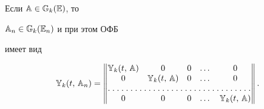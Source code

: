 \begin{lemnonum} 


Если $\Bbb A\in\Bbb G_k(\Bbb E)$, то 


$\Bbb A_n\in\Bbb G_k(\Bbb E_n)$ и при этом ОФБ 


имеет вид 


$$ 


\Bbb Y_k(t,\,\Bbb A_n)= 


\begin{Vmatrix} 


\Bbb Y_k(t,\,\Bbb A) & 0 & 0 & \dotsc & 0 \\ 


0 & \Bbb Y_k(t,\,\Bbb A) & 0 & \dotsc & 0 \\ 


\hdotsfor[1.5]{5}\\ 


0 & 0 & 0 & \dotsc & \Bbb Y_k(t,\,\Bbb A) 


\end{Vmatrix} 


. 


$$ 


\end{lemnonum} 


 


